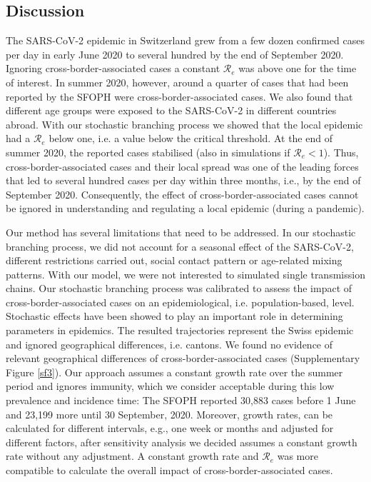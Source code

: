 \documentclass[10pt, a4paper, twoside]{article}
\begin{document}
\begin{multicols}{2}
\section{Discussion}
The SARS-CoV-2 epidemic in Switzerland grew from a few dozen confirmed cases per day in early June 2020 to several hundred by the end of September 2020.
Ignoring cross-border-associated cases a constant $\mathcal{R}_e$ was above one for the time of interest.
In summer 2020, however, around a quarter of cases that had been reported by the SFOPH were cross-border-associated cases.
We also found that different age groups were exposed to the SARS-CoV-2 in different countries abroad.
With our stochastic branching process we showed that the local epidemic had a $\mathcal{R}_e$ below one, i.e. a value below the critical threshold.
At the end of summer 2020, the reported cases stabilised (also in simulations if $\mathcal{R}_e <1$).
Thus, cross-border-associated cases and their local spread was one of the leading forces that led to several hundred cases per day within three months, i.e., by the end of September 2020.
Consequently, the effect of cross-border-associated cases cannot be ignored in understanding and regulating a local epidemic (during a pandemic).

Our method has several limitations that need to be addressed.
In our stochastic branching process, we did not account for a seasonal effect of the SARS-CoV-2, different restrictions carried out, social contact pattern or age-related mixing patterns.
With our model, we were not interested to simulated single transmission chains.
Our stochastic branching process was calibrated to assess the impact of cross-border-associated cases on an epidemiological, i.e. population-based, level.
Stochastic effects have been showed to play an important role in determining parameters in epidemics.\cite{althaus_ebola_2015,riou_pattern_2020}
The resulted trajectories represent the Swiss epidemic and ignored geographical differences, i.e. cantons.
We found no evidence of relevant geographical differences of cross-border-associated cases (Supplementary Figure \ref{sf3}).
Our approach assumes a constant growth rate over the summer period and ignores immunity, which we consider acceptable during this low prevalence and incidence time:
The SFOPH reported 30,883 cases before 1 June and 23,199 more until 30 September, 2020.
Moreover, growth rates, can be calculated for different intervals, e.g., one week or months and adjusted for different factors, after sensitivity analysis we decided assumes a constant growth rate without any adjustment.
A constant growth rate and $\mathcal{R}_e$ was more compatible to calculate the overall impact of cross-border-associated cases.


\end{multicols}
\end{document}
